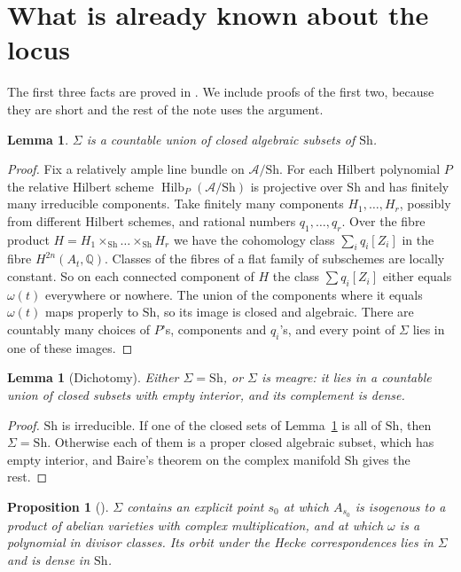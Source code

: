 \documentclass[11pt]{amsart}
\newtheorem{proposition}[theorem]{Proposition}
\newtheorem{lemma}[theorem]{Lemma}
\theoremstyle{definition}
\theoremstyle{remark}
\newcommand{\QQ}{\mathbb{Q}}
\newcommand{\Sh}{\mathrm{Sh}}
\newcommand{\Hilb}{\operatorname{Hilb}}
\begin{document}
\section{What is already known about the locus}

The first three facts are proved in \cite{BhH8}. We include proofs of the
first two, because they are short and the rest of the note uses the
argument.

\begin{lemma}\label{lem:countable}
$\Sigma$ is a countable union of closed algebraic subsets of $\Sh$.
\end{lemma}

\begin{proof}
Fix a relatively ample line bundle on $\mathcal A/\Sh$. For each Hilbert
polynomial $P$ the relative Hilbert scheme $\Hilb_{P}(\mathcal A/\Sh)$ is
projective over $\Sh$ and has finitely many irreducible components. Take
finitely many components $H_{1},\dots,H_{r}$, possibly from different
Hilbert schemes, and rational numbers $q_{1},\dots,q_{r}$. Over the fibre
product $H=H_{1}\times_{\Sh}\dots\times_{\Sh}H_{r}$ we have the cohomology
class $\sum_{i}q_{i}[Z_{i}]$ in the fibre $H^{2n}(A_{t},\QQ)$. Classes of
the fibres of a flat family of subschemes are locally constant. So on each
connected component of $H$ the class $\sum q_{i}[Z_{i}]$ either equals
$\omega(t)$ everywhere or nowhere. The union of the components where it
equals $\omega(t)$ maps properly to $\Sh$, so its image is closed and
algebraic. There are countably many choices of $P$'s, components and
$q_{i}$'s, and every point of $\Sigma$ lies in one of these images.
\end{proof}

\begin{lemma}[Dichotomy]\label{lem:dichotomy}
Either $\Sigma=\Sh$, or $\Sigma$ is meagre: it lies in a countable union
of closed subsets with empty interior, and its complement is dense.
\end{lemma}

\begin{proof}
$\Sh$ is irreducible. If one of the closed sets of
Lemma~\ref{lem:countable} is all of $\Sh$, then $\Sigma=\Sh$. Otherwise
each of them is a proper closed algebraic subset, which has empty
interior, and Baire's theorem on the complex manifold $\Sh$ gives the rest.
\end{proof}

\begin{proposition}[\cite{BhH8}]\label{prop:dense}
$\Sigma$ contains an explicit point $s_{0}$ at which $A_{s_{0}}$ is
isogenous to a product of abelian varieties with complex multiplication,
and at which $\omega$ is a polynomial in divisor classes. Its orbit under
the Hecke correspondences lies in $\Sigma$ and is dense in $\Sh$.
\end{proposition}
\end{document}
